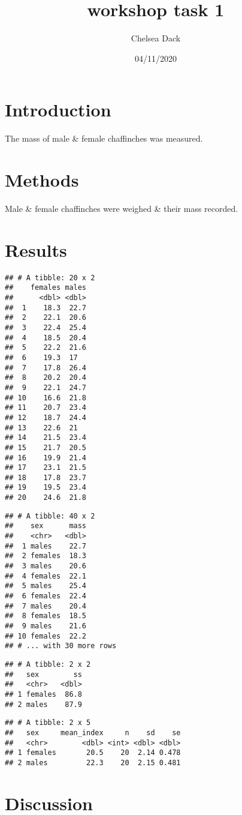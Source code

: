 \documentclass[
]{article}
\title{workshop task 1}
\author{Chelsea Dack}
\date{04/11/2020}
\begin{document}
\maketitle

{
\setcounter{tocdepth}{2}
\tableofcontents
}
\hypertarget{introduction}{%
\section{Introduction}\label{introduction}}

The mass of male \& female chaffinches was measured.

\hypertarget{methods}{%
\section{Methods}\label{methods}}

Male \& female chaffinches were weighed \& their mass recorded.

\hypertarget{results}{%
\section{Results}\label{results}}

\begin{verbatim}
## # A tibble: 20 x 2
##    females males
##      <dbl> <dbl>
##  1    18.3  22.7
##  2    22.1  20.6
##  3    22.4  25.4
##  4    18.5  20.4
##  5    22.2  21.6
##  6    19.3  17  
##  7    17.8  26.4
##  8    20.2  20.4
##  9    22.1  24.7
## 10    16.6  21.8
## 11    20.7  23.4
## 12    18.7  24.4
## 13    22.6  21  
## 14    21.5  23.4
## 15    21.7  20.5
## 16    19.9  21.4
## 17    23.1  21.5
## 18    17.8  23.7
## 19    19.5  23.4
## 20    24.6  21.8
\end{verbatim}

\begin{verbatim}
## # A tibble: 40 x 2
##    sex      mass
##    <chr>   <dbl>
##  1 males    22.7
##  2 females  18.3
##  3 males    20.6
##  4 females  22.1
##  5 males    25.4
##  6 females  22.4
##  7 males    20.4
##  8 females  18.5
##  9 males    21.6
## 10 females  22.2
## # ... with 30 more rows
\end{verbatim}

\begin{verbatim}
## # A tibble: 2 x 2
##   sex        ss
##   <chr>   <dbl>
## 1 females  86.8
## 2 males    87.9
\end{verbatim}

\begin{verbatim}
## # A tibble: 2 x 5
##   sex     mean_index     n    sd    se
##   <chr>        <dbl> <int> <dbl> <dbl>
## 1 females       20.5    20  2.14 0.478
## 2 males         22.3    20  2.15 0.481
\end{verbatim}

\hypertarget{discussion}{%
\section{Discussion}\label{discussion}}
\end{document}
